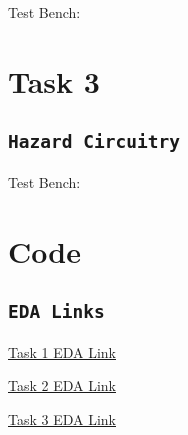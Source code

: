 \documentclass[a4paper, 12pt]{report}
\begin{document}
    
    Test Bench:
    
   
   
   \chapter{Task 3}
    \section{\texttt{Hazard Circuitry}}
    
    
    Test Bench:
    
    
   \chapter{Code}
    \section{\texttt{EDA Links}}
    
    \href{https://www.edaplayground.com/x/Dzti}{Task 1 EDA Link}
    
    \href{https://www.edaplayground.com/x/Dzti}{Task 2 EDA Link}
        
    \href{https://www.edaplayground.com/x/Dzti}{Task 3 EDA Link}


\end{document}

